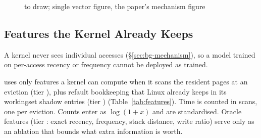 \begin{figure}[t]
\centering
{}
{to draw; single vector figure, the paper's mechanism figure}
\caption{}
\label{fig:overview}
\end{figure}

\subsection{Features the Kernel Already Keeps}
\label{sec:design-features}

 A kernel never sees individual accesses
(\S\ref{sec:bg-mechanism}), so a model trained on per-access recency or frequency cannot
be deployed as trained.

 \sys uses only features a kernel can compute when it scans the
resident pages at an eviction (tier \tierK), plus refault bookkeeping that Linux already
keeps in its workingset shadow entries (tier \tierKp) (Table~\ref{tab:features}). Time is
counted in scans, one per eviction. Counts enter as $\log(1+x)$ and are standardised.
Oracle features (tier \tierF: exact recency, frequency, stack distance, write ratio)
serve only as an ablation that bounds what extra information is worth.

